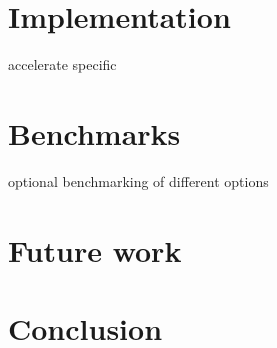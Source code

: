 \documentclass{article}
\begin{document}
\newpage

\section{Implementation}

accelerate specific

\section{Benchmarks}

optional benchmarking of different options

\section{Future work}

\section{Conclusion}

\newpage



\end{document}
